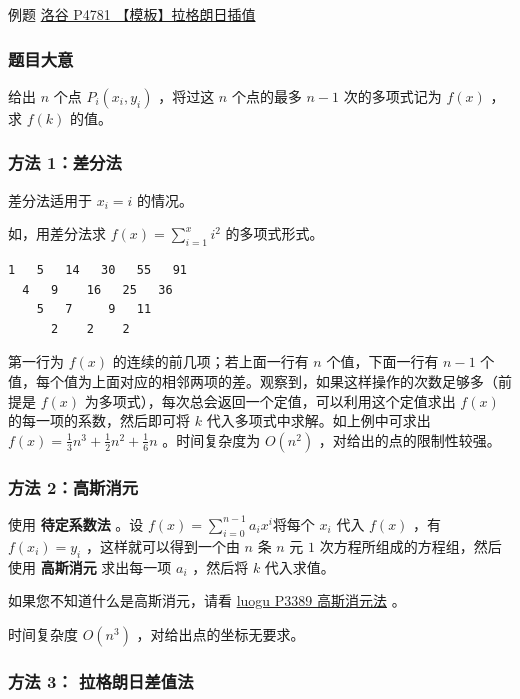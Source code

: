 
\begin{NOTE}{例题 \href{https://www.luogu.org/problemnew/show/P4781}{洛谷 P4781 【模板】拉格朗日插值}}{}

\end{NOTE}


\subsubsection{题目大意}

给出 $n$ 个点 $P_i(x_i,y_i)$ ，将过这 $n$ 个点的最多 $n-1$ 次的多项式记为 $f(x)$ ，求 $f(k)$ 的值。

\subsubsection{方法 1：差分法}

差分法适用于 $x_i=i$ 的情况。

如，用差分法求 $f(x)=\sum_{i=1}^{x} i^2$ 的多项式形式。

\begin{verbatim}
1   5   14   30   55   91
  4   9    16   25   36
    5   7     9   11
      2    2    2
\end{verbatim}

第一行为 $f(x)$ 的连续的前几项；若上面一行有 $n$ 个值，下面一行有 $n-1$ 个值，每个值为上面对应的相邻两项的差。观察到，如果这样操作的次数足够多（前提是 $f(x)$ 为多项式），每次总会返回一个定值，可以利用这个定值求出 $f(x)$ 的每一项的系数，然后即可将 $k$ 代入多项式中求解。如上例中可求出 $f(x)=\frac 1 3 n^3+\frac 1 2 n^2+\frac 1 6 n$ 。时间复杂度为 $O(n^2)$ ，对给出的点的限制性较强。

\subsubsection{方法 2：高斯消元}

使用 \textbf{ 待定系数法 } 。设 $f(x)=\sum_{i=0}^{n-1} a_ix^i$将每个 $x_i$ 代入 $f(x)$ ，有 $f(x_i)=y_i$ ，这样就可以得到一个由 $n$ 条 $n$ 元 $1$ 次方程所组成的方程组，然后使用 \textbf{ 高斯消元 } 求出每一项 $a_i$ ，然后将 $k$ 代入求值。

如果您不知道什么是高斯消元，请看 \href{https://www.luogu.org/problemnew/show/P3389}{luogu P3389 高斯消元法} 。

时间复杂度 $O(n^3)$ ，对给出点的坐标无要求。

\subsubsection{方法 3： 拉格朗日差值法}

